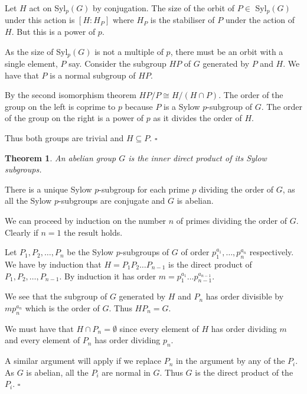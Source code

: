 \documentclass[10pt]{article}
\newtheorem{theorem}{Theorem}[section]
\newenvironment{proof}[1][Proof]{\begin{trivlist}
\item[\hskip \labelsep {\itshape #1}]}{\end{trivlist}}
\begin{document}
\begin{proof}
Let $H$ act on Syl$_p(G)$ by conjugation. The size of the orbit of $P \in$ Syl$_p(G)$ under this action is $[H:H_P]$ where $H_P$ is the stabiliser of $P$ under the action of $H$. But this is a power of $p$.

As the size of Syl$_p(G)$ is not a multiple of $p$, there must be an orbit with a single element, $P$ say. Consider the subgroup $HP$ of $G$ generated by $P$ and $H$. We have that $P$ is a normal subgroup of $HP$.

By the second isomorphism theorem $HP/P \cong H/(H\cap P)$. The order of the group on the left is coprime to $p$ because $P$ is a Sylow $p$-subgroup of $G$. The order of the group on the right is a power of $p$ as it divides the order of $H$. 

Thus both groups are trivial and $H \subseteq P$. $\square$
\end{proof}

\begin{theorem}
An abelian group $G$ is the inner direct product of its Sylow subgroups.
\end{theorem}

\begin{proof}
There is a unique Sylow $p$-subgroup for each prime $p$ dividing the order of $G$, as all the Sylow $p$-subgroups are conjugate and $G$ is abelian.

We can proceed by induction on the number $n$ of primes dividing the order of $G$. Clearly if $n = 1$ the result holds.

Let $P_1, P_2, \ldots, P_n$ be the Sylow $p$-subgroups of $G$ of order $p_1^{a_1}, \ldots, p_n^{a_n}$ respectively. We have by induction that $H = P_1P_2\ldots P_{n-1}$ is the direct product of $P_1, P_2, \ldots, P_{n-1}$. By induction it has order $m = p_1^{a_1}\ldots p_{n-1}^{a_{n-1}}$.

We see that the subgroup of $G$ generated by $H$ and $P_n$ has order divisible by $mp_n^{a_n}$ which is the order of $G$. Thus $HP_n = G$.

We must have that $H\cap P_n = \emptyset$ since every element of $H$ has order dividing $m$ and every element of $P_n$ has order dividing $p_n$.

A similar argument will apply if we replace $P_n$ in the argument by any of the $P_i$. As $G$ is abelian, all the $P_i$ are normal in $G$. Thus $G$ is the direct product of the $P_i$. $\square$
\end{proof}
\end{document}
